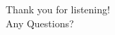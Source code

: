 \documentclass{beamer}
\begin{document}
%
%
%

\begin{frame}
	Thank you for listening!\\Any Questions?
\end{frame}
\end{document}
